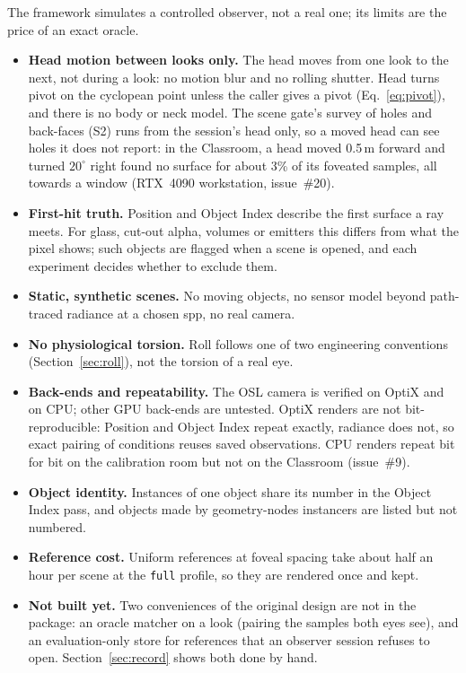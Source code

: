 \documentclass[11pt,a4paper]{article}
\newcommand{\code}[1]{\texttt{\small #1}}
\begin{document}
The framework simulates a controlled observer, not a real one; its limits are the price of an exact oracle.
\begin{itemize}
\item \textbf{Head motion between looks only.} The head moves from one look to the next, not during a look: no
  motion blur and no rolling shutter. Head turns pivot on the cyclopean point unless the caller gives a pivot
  (Eq.~\eqref{eq:pivot}), and there is no body or neck model. The scene gate's survey of holes and back-faces (S2)
  runs from the session's head only, so a moved head can see holes it does not report: in the Classroom, a head
  moved 0.5\,m forward and turned $20^\circ$ right found no surface for about 3\% of its foveated samples, all
  towards a window (RTX~4090 workstation, issue~\#20).
\item \textbf{First-hit truth.} Position and Object Index describe the first surface a ray meets. For glass,
  cut-out alpha, volumes or emitters this differs from what the pixel shows; such objects are flagged when a
  scene is opened, and each experiment decides whether to exclude them.
\item \textbf{Static, synthetic scenes.} No moving objects, no sensor model beyond path-traced radiance at a
  chosen spp, no real camera.
\item \textbf{No physiological torsion.} Roll follows one of two engineering conventions
  (Section~\ref{sec:roll}), not the torsion of a real eye.
\item \textbf{Back-ends and repeatability.} The OSL camera is verified on OptiX and on CPU; other GPU back-ends
  are untested. OptiX renders are not bit-reproducible: Position and Object Index repeat exactly, radiance does
  not, so exact pairing of conditions reuses saved observations. CPU renders repeat bit for bit on the
  calibration room but not on the Classroom (issue~\#9).
\item \textbf{Object identity.} Instances of one object share its number in the Object Index pass, and objects
  made by geometry-nodes instancers are listed but not numbered.
\item \textbf{Reference cost.} Uniform references at foveal spacing take about half an hour per scene at the
  \code{full} profile, so they are rendered once and kept.
\item \textbf{Not built yet.} Two conveniences of the original design are not in the package: an oracle
  matcher on a look (pairing the samples both eyes see), and an evaluation-only store for references that an
  observer session refuses to open. Section~\ref{sec:record} shows both done by hand.
\end{itemize}
\end{document}
